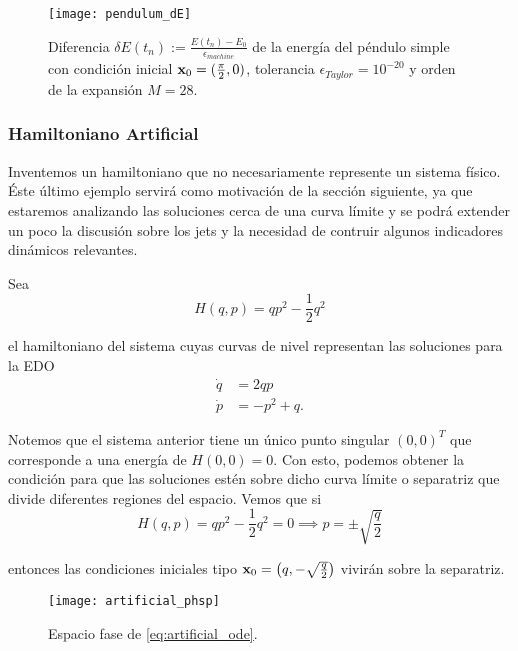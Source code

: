 \begin{figure}[h!]
 \centering
 \texttt{[image: pendulum\_dE]}
 \caption{Diferencia $\delta E(t_n) := \frac{E(t_n) - E_0}{\epsilon_{machine}}$ de la energía del péndulo simple con condición inicial $\mathbf{x}_0 = (\frac{\pi}{2},0)$, tolerancia $\epsilon_{Taylor} = 10^{-20}$ y orden de la expansión $M = 28$.}
 \label{fig:pendulum_dE}
\end{figure}

\subsubsection{Hamiltoniano Artificial}
\label{sec:artificial_ham}

Inventemos un hamiltoniano que no necesariamente represente un sistema físico. Éste último ejemplo servirá como motivación de la sección siguiente, ya que estaremos analizando las soluciones cerca de una curva límite y se podrá extender un poco la discusión sobre los jets y la necesidad de contruir algunos indicadores dinámicos relevantes. 

Sea 
\begin{equation}
 H(q,p) = qp^2 - \frac{1}{2}q^2
 \label{eq:artificial_ham}
\end{equation}

el hamiltoniano del sistema cuyas curvas de nivel representan las soluciones para la EDO
\begin{align}
 \dot{q} &= 2qp \nonumber \\
 \dot{p} &= -p^2 + q.
 \label{eq:artificial_ode}
\end{align}


Notemos que el sistema anterior tiene un único punto singular $(0,0)^T$ que corresponde a una energía de $H(0,0) = 0$. Con esto, podemos obtener la condición para que las soluciones estén sobre dicho curva límite o separatriz que divide diferentes regiones del espacio. Vemos que si
\begin{equation*}
 H(q,p) = qp^2 - \frac{1}{2}q^2 = 0 \implies p = \pm \sqrt{\frac{q}{2}} 
\end{equation*}

entonces las condiciones iniciales tipo $\mathbf{x}_0 = \left( q, -\sqrt{\frac{q}{2}} \right)$ vivirán sobre la separatriz. 

\begin{figure}[h!]
 \centering
 \texttt{[image: artificial\_phsp]}
 \caption{Espacio fase de \ref{eq:artificial_ode}.}
 \label{fig:artificial_phsp}
\end{figure}

